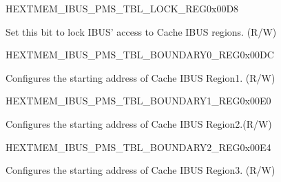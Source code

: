 \begin{register}{H}{EXTMEM\_IBUS\_PMS\_TBL\_LOCK\_REG}{0x00D8}\label{regdesc:EXTMEMIBUSPMSTBLLOCKREG}
%
%
\regnewline%
\begin{regdesc}\begin{reglist}
\label{fielddesc:EXTMEMIBUSPMSLOCK}\item [EXTMEM\_IBUS\_PMS\_LOCK] Set this bit to lock IBUS' access to Cache IBUS regions. (R/W)
\end{reglist}\end{regdesc}
\end{register}


\begin{register}{H}{EXTMEM\_IBUS\_PMS\_TBL\_BOUNDARY0\_REG}{0x00DC}\label{regdesc:EXTMEMIBUSPMSTBLBOUNDARY0REG}
%
%
\regnewline%
\begin{regdesc}\begin{reglist}
\label{fielddesc:EXTMEMIBUSPMSBOUNDARY0}\item [EXTMEM\_IBUS\_PMS\_BOUNDARY0] Configures the starting address of Cache IBUS Region1. (R/W)
\end{reglist}\end{regdesc}
\end{register}


\begin{register}{H}{EXTMEM\_IBUS\_PMS\_TBL\_BOUNDARY1\_REG}{0x00E0}\label{regdesc:EXTMEMIBUSPMSTBLBOUNDARY1REG}
%
%
\regnewline%
\begin{regdesc}\begin{reglist}
\label{fielddesc:EXTMEMIBUSPMSBOUNDARY1}\item [EXTMEM\_IBUS\_PMS\_BOUNDARY1] Configures the starting address of Cache IBUS Region2.(R/W)
\end{reglist}\end{regdesc}
\end{register}


\begin{register}{H}{EXTMEM\_IBUS\_PMS\_TBL\_BOUNDARY2\_REG}{0x00E4}\label{regdesc:EXTMEMIBUSPMSTBLBOUNDARY2REG}
%
%
\regnewline%
\begin{regdesc}\begin{reglist}
\label{fielddesc:EXTMEMIBUSPMSBOUNDARY2}\item [EXTMEM\_IBUS\_PMS\_BOUNDARY2] Configures the starting address of Cache IBUS Region3. (R/W)
\end{reglist}\end{regdesc}
\end{register}


